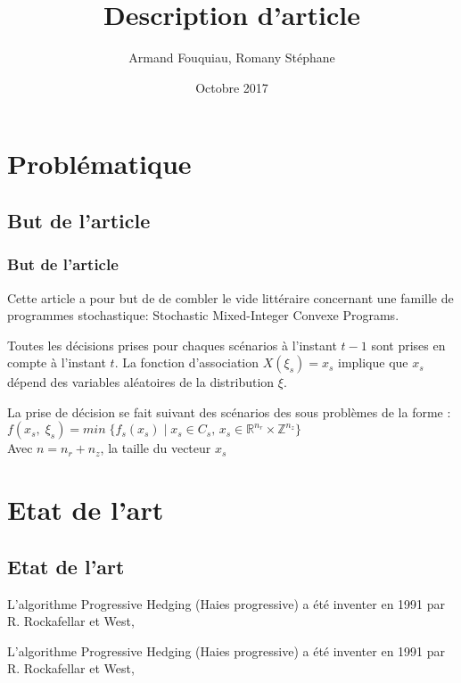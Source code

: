 \documentclass[10pt]{beamer}
\title{Description d'article}
\author{Armand Fouquiau, Romany Stéphane}
\institute{Université Paris-Sud}
\date{Octobre 2017}
\newcommand{\reels}{\mathbb{R}}
\newcommand{\integers}{\mathbb{Z}}
\begin{document}
    \begin{frame}
    \titlepage
    \end{frame}

    \section{Problématique}
    \subsection{But de l'article}
        \begin{frame}
        \frametitle{But de l'article}
        Cette article a pour but de de combler le vide littéraire concernant une famille de programmes stochastique: Stochastic Mixed-Integer Convexe Programs.
    \end{frame}
        
    \begin{frame}
        Toutes les décisions prises pour chaques scénarios à l'instant $t-1$ sont prises en compte à l'instant $t$. La fonction d'association $X(\xi_s) = x_s$ implique que $x_s$ dépend des variables aléatoires de la distribution $\xi$.
    \end{frame}
    
    
    \begin{frame}
        La prise de décision se fait suivant des scénarios des sous problèmes de la forme : 
         $f(x_s, \;\xi_{s}) = min \;\{f_s(x_s) \; | \; x_s \in C_s, \,x_s \in \reels^{n_r} \times \integers^{n_z}\}$\\
         Avec $n = n_r + n_z$, la taille du vecteur $x_s$
    \end{frame}    
    
    
    \section{Etat de l'art}
    \subsection{Etat de l'art}
    \begin{frame}
        L'algorithme Progressive Hedging (Haies progressive) a été inventer en 1991 par R. Rockafellar et West, 
    \end{frame}
    
    \begin{frame}
        L'algorithme Progressive Hedging (Haies progressive) a été inventer en 1991 par R. Rockafellar et West, 
    \end{frame}
        
\end{document}
